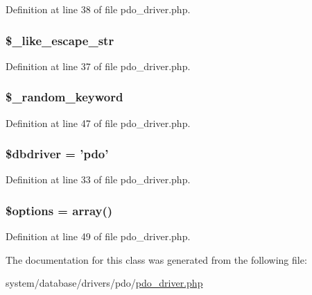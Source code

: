 Definition at line 38 of file pdo\-\_\-driver.\-php.

\hypertarget{class_c_i___d_b__pdo__driver_adf86ecadf3d0e1ce3f5e0eaeeb3867ae}{
\subsubsection[{\$\-\_\-like\-\_\-escape\-\_\-str}]{\setlength{\rightskip}{0pt plus 5cm}\$\-\_\-like\-\_\-escape\-\_\-str}}\label{class_c_i___d_b__pdo__driver_adf86ecadf3d0e1ce3f5e0eaeeb3867ae}


Definition at line 37 of file pdo\-\_\-driver.\-php.

\hypertarget{class_c_i___d_b__pdo__driver_a10213aa6e05f6d924d3277bb1d2fea00}{
\subsubsection[{\$\-\_\-random\-\_\-keyword}]{\setlength{\rightskip}{0pt plus 5cm}\$\-\_\-random\-\_\-keyword}}\label{class_c_i___d_b__pdo__driver_a10213aa6e05f6d924d3277bb1d2fea00}


Definition at line 47 of file pdo\-\_\-driver.\-php.

\hypertarget{class_c_i___d_b__pdo__driver_a0cde2a16322a023d040aa7f725877597}{
\subsubsection[{\$dbdriver}]{\setlength{\rightskip}{0pt plus 5cm}\$dbdriver = 'pdo'}}\label{class_c_i___d_b__pdo__driver_a0cde2a16322a023d040aa7f725877597}


Definition at line 33 of file pdo\-\_\-driver.\-php.

\hypertarget{class_c_i___d_b__pdo__driver_a011800c63ece4cbbfa77136a20607023}{
\subsubsection[{\$options}]{\setlength{\rightskip}{0pt plus 5cm}\$options = array()}}\label{class_c_i___d_b__pdo__driver_a011800c63ece4cbbfa77136a20607023}


Definition at line 49 of file pdo\-\_\-driver.\-php.



The documentation for this class was generated from the following file\-:\begin{DoxyCompactItemize}
\item 
system/database/drivers/pdo/\hyperlink{pdo__driver_8php}{pdo\-\_\-driver.\-php}\end{DoxyCompactItemize}
